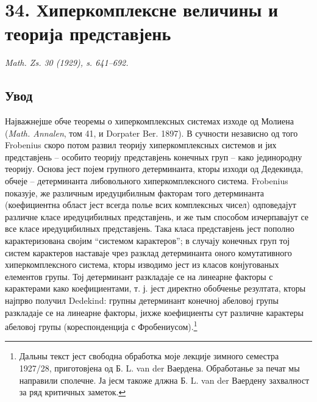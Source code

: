 ﻿\documentclass[11pt]{article}
\begin{document}
\setcounter{footnote}{0}

\section*{34. Хиперкомплексне величины и теорија представјень}
\emph{Math. Zs. 30 (1929), s. 641--692.}

\subsection*{Увод}

Најважнејше обче теоремы о хиперкомплексных системах изходе од Молиена (\emph{Math. Annalen}, том 41, и Dorpater Ber. 1897). В сучности независно од того Frobenius скоро потом развил теорију хиперкомплексных системов и јих представјень -- особито теорију представјень конечных груп -- како јединородну теорију. Основа јест појем групного детерминанта, кторы изходи од Дедекинда, обчеје -- детерминанта либовольного хиперкомплексного система. Frobenius показује, же различным иредуцибилным факторам того детерминанта (коефициентна област јест всегда полье всих комплексных чисел) одповедајут различне класе иредуцибилных представјень, и же тым способом изчерпавајут се все класе иредуцибилных представјень. Така класа представјень јест пополно карактеризована својим “системом карактеров”; в случају конечных груп тој систем карактеров наставаје чрез разклад детерминанта оного комутативного хиперкомплексного система, кторы изводимо јест из класов конјугованых елементов групы. Тој детерминант разкладаје се на линеарне факторы с карактерами како коефициентами, т. ј. јест директно обобченье резултата, кторы најпрво получил Dedekind: групны детерминант конечној абеловој групы разкладаје се на линеарне факторы, јихже коефициенты сут различне карактеры абеловој групы (кореспонденција с Фробениусом).\footnote{Дальны текст јест свободна обработка моје лекције зимного семестра 1927/28, приготовјена од Б. L. van der Ваердена. Обработанье за печат мы направили сполечне. Ја јесм такоже длжна Б. L. van der Ваердену захвалност за ряд критичных заметок.}
\end{document}
